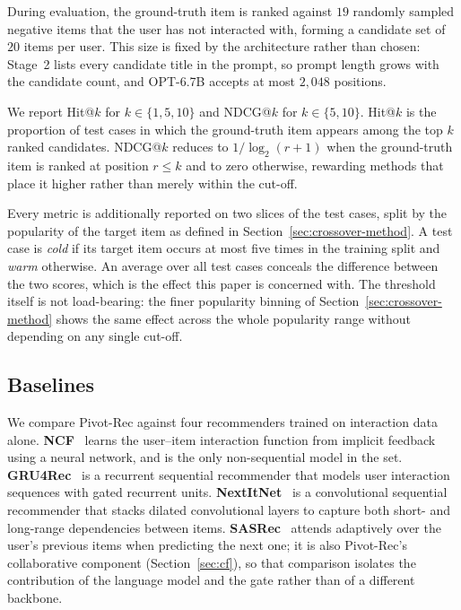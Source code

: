 \documentclass[runningheads]{llncs}
\begin{document}
During evaluation, the ground-truth item is ranked against $19$ randomly sampled
negative items that the user has not interacted with, forming a candidate set of $20$
items per user. This size is fixed by the architecture rather than chosen: Stage~2 lists every candidate title in
the prompt, so prompt length grows with the candidate count, and OPT-6.7B accepts at
most $2{,}048$ positions.

We report Hit@$k$ for $k \in \{1, 5, 10\}$ and NDCG@$k$ for $k \in \{5, 10\}$.
Hit@$k$ is the proportion of test cases in which the ground-truth item appears among
the top $k$ ranked candidates. NDCG@$k$ reduces to $1/\log_2(r+1)$ when the ground-truth item
is ranked at position $r \le k$ and to zero otherwise, rewarding methods that place it
higher rather than merely within the cut-off.

Every metric is additionally reported on two slices of the test cases, split by the
popularity of the target item as defined in Section~\ref{sec:crossover-method}. A test
case is \emph{cold} if its target item occurs at most five times in the training split
and \emph{warm} otherwise. An average over all test cases conceals the difference
between the two scores, which is the effect this paper is concerned with. The
threshold itself is not load-bearing: the finer popularity binning of
Section~\ref{sec:crossover-method} shows the same effect across the whole popularity
range without depending on any single cut-off.



\subsection{Baselines}
\label{sec:baselines}

We compare Pivot-Rec against four recommenders trained on interaction data alone.
\textbf{NCF}~\cite{he2017neural} learns the user--item interaction function from
implicit feedback using a neural network, and is the only non-sequential model in
the set. \textbf{GRU4Rec}~\cite{hidasi2015session} is a recurrent sequential
recommender that models user interaction sequences with gated recurrent units.
\textbf{NextItNet}~\cite{yuan2019simple} is a convolutional sequential recommender
that stacks dilated convolutional layers to capture both short- and long-range
dependencies between items. \textbf{SASRec}~\cite{sasrec} attends adaptively over
the user's previous items when predicting the next one; it is also Pivot-Rec's
collaborative component (Section~\ref{sec:cf}), so that comparison isolates the
contribution of the language model and the gate rather than of a different
backbone.
\end{document}
